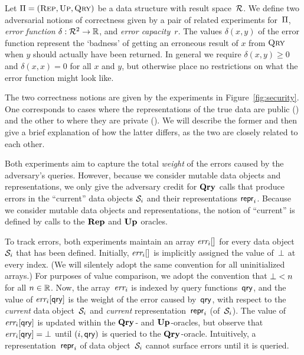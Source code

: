 


Let $\mathrm{\Pi}=(\textnormal{\textsc{Rep}},\textnormal{\textsc{Up}},\textnormal{\textsc{Qry}})$ be a data structure with result space~$\mathcal{R}$.
%
We define two adversarial notions of correctness given by a pair of related
experiments for~$\mathrm{\Pi}$, \emph{error function} $\delta:\mathcal{R}^2 \to \mathbb{R}$,
and \emph{error capacity}~$r$. The values $\delta(x,y)$ of the error function
represent the `badness' of getting an erroneous result of $x$ from $\textnormal{\textsc{Qry}}$ when
$y$ should actually have been returned. In general we require
$\delta(x,y) \geq 0$ and $\delta(x,x) = 0$ for all $x$ and $y$, but otherwise
place no restrictions on what the error function might look like.

The two correctness notions are given by the experiments in
Figure~\ref{fig:security}. One corresponds to cases where the representations of
the true data are public (\errep) and the other to where they are private
(\erreps). We will describe the former and then give a brief explanation of how
the latter differs, as the two are closely related to each other.

Both experiments aim to capture the total \emph{weight} of the errors caused by
the adversary's queries. However, because we consider mutable data objects and
representations, we only give the adversary credit for $\textup{\textbf{Qry}}\hspace{0.5pt}$ calls that
produce errors in the ``current'' data objects $\mathcal{S}_i$ and their
representations $\mathsf{repr}_i$. Because we consider mutable data objects and
representations, the notion of ``current'' is defined by calls to the $\textup{\textbf{Rep}}\hspace{0.5pt}$
and $\textup{\textbf{Up}}\hspace{0.5pt}$ oracles.

To track errors, both experiments maintain an array $\textit{err}_i[]$ for every data
object~$\mathcal{S}_i$ that has been defined.  Initially, $\textit{err}_i[]$ is implicitly
assigned the value of~$\bot$ at every index. (We will silentely adopt the
same convention for all uninitialized arrays.) For purposes of value
comparison, we adopt the convention that $\bot < n$ for all $n \in \mathbb{R}$.
%
Now, the array~$\textit{err}_i$ is indexed by query functions~$\mathsf{qry}$, and the value of
$\textit{err}_i[\mathsf{qry}]$ is the weight of the error caused by~$\mathsf{qry}$, with respect to
the \emph{current} data object~$\mathcal{S}_i$ and \emph{current}
representation~$\mathsf{repr}_i$ (of~$\mathcal{S}_i$).
%
The value of~$\textit{err}_i[\mathsf{qry}]$ is updated within the $\textup{\textbf{Qry}}\hspace{0.5pt}$- and $\textup{\textbf{Up}}\hspace{0.5pt}$-oracles,
but observe that $\textit{err}_i[\mathsf{qry}] = \bot$ until $(i,\mathsf{qry})$ is queried to the
$\textup{\textbf{Qry}}\hspace{0.5pt}$-oracle.  Intuitively, a representation~$\mathsf{repr}_i$ of data object~$\mathcal{S}_i$
cannot surface errors until it is queried.

